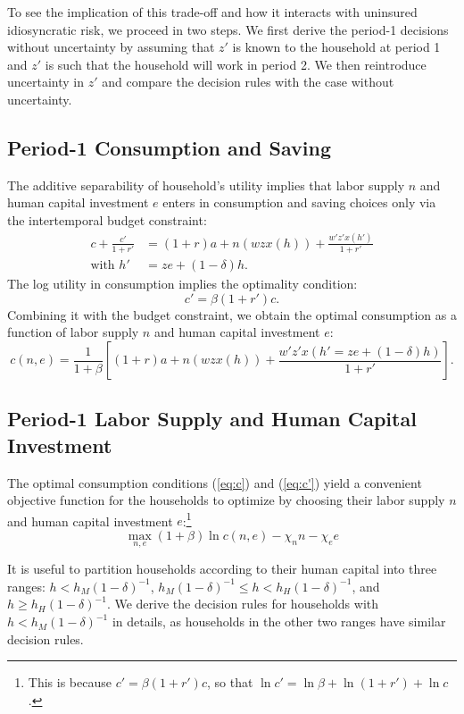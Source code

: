 \documentclass[12pt]{article}
\begin{document}
To see the implication of this trade-off and how it interacts with uninsured idiosyncratic risk, we proceed in two steps. We first derive the period-1 decisions without uncertainty by assuming that $z'$ is known to the household at period 1 and $z'$ is such that the household will work in period 2. We then reintroduce uncertainty in $z'$ and compare the decision rules with the case without uncertainty.

\subsection{Period-1 Consumption and Saving}

The additive separability of household's utility implies that labor supply $n$ and human capital investment $e$ enters in consumption and saving choices only via the intertemporal budget constraint:
\begin{align*}
    c + \frac{c'}{1+r'}&=(1+r)a+n(wzx(h))+\frac{w'z'x(h')}{1+r'} \\
    \text{with } h'&=ze+ (1-\delta)h.
\end{align*}
The log utility in consumption implies the optimality condition:
\begin{equation}\label{eq:c'}
     c'=\beta(1+r')c.
\end{equation}
Combining it with the budget constraint, we obtain the optimal consumption as a function of labor supply $n$ and human capital investment $e$:
\begin{equation}\label{eq:c}
    c(n,e)=\frac{1}{1+\beta}\left[(1+r)a+n(wzx(h))+\frac{w'z'x\left(h'=ze+ (1-\delta)h\right)}{1+r'} \right].
\end{equation}

\subsection{Period-1 Labor Supply and Human Capital Investment} 
The optimal consumption conditions (\ref{eq:c}) and (\ref{eq:c'}) yield a convenient objective function for the households to optimize by choosing their labor supply $n$ and human capital investment $e$:\footnote{This is because $c'=\beta(1+r')c$, so that $\ln c'=\ln \beta + \ln(1+r')+\ln c$.} 
\begin{equation}
   \max_{n,e} (1+\beta)\ln c(n,e) - \chi_n n - \chi_e e
\end{equation}

It is useful to partition households according to their human capital into three ranges: $h<h_M(1-\delta)^{-1}$, $h_M(1-\delta)^{-1}\leq h<h_H(1-\delta)^{-1}$, and $h \geq h_H(1-\delta)^{-1}$. We derive the decision rules for households with $h<h_M(1-\delta)^{-1}$ in details, as households in the other two ranges have similar decision rules.
\end{document}
